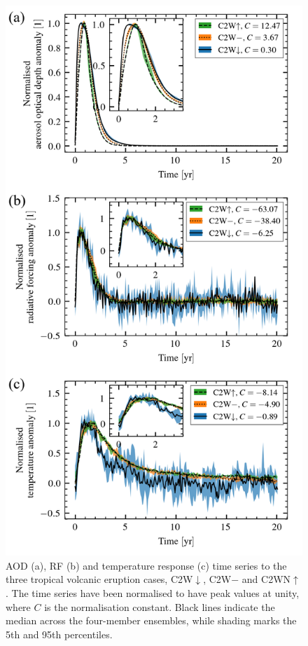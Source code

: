\documentclass[draft]{agujournal2019}
\newcommand{\cwmp}{C2W\(-\)}
\newcommand{\cwm}{C2W\(\downarrow\)}
\newcommand{\cws}{C2WN\(\uparrow\)}
\begin{document}
\begin{figure}
  \centering
  \includegraphics{figures/figure1.png}

  \caption{AOD (a), RF (b) and temperature response (c) time series to the three tropical
    volcanic eruption cases, \cwm{}, \cwmp{} and \cws{}. The time series have been
    normalised to have peak values at unity, where \(C\) is the normalisation constant.
    Black lines indicate the median across the four-member ensembles, while shading marks
    the 5th and 95th percentiles.}\label{fig:compare-waveform-temp}%
\end{figure}
\end{document}
